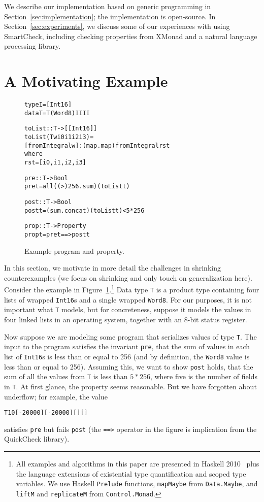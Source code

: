 \documentclass{sigplanconf}
\newenvironment{code}{\begin{alltt}}{\end{alltt}}
\newcommand{\ttp}[1]{\texttt{#1}}
\begin{document}
We describe our implementation based on generic programming in
Section~\ref{sec:implementation}; the implementation is open-source.  In
Section~\ref{sec:experiments}, we discuss some of our experiences with using
SmartCheck, including checking properties from XMonad and a natural language
processing library.

\section{A Motivating Example}\label{sec:example}

\begin{figure}[ht]
\begin{code}
type I   = [Int16]
data T   = T (Word8) I I I I

toList :: T -> [[Int16]]
toList (T w i0 i1 i2 i3) =
  [fromIntegral w] : (map . map) fromIntegral rst
  where
  rst = [i0, i1, i2, i3]

pre :: T -> Bool
pre t = all ((>) 256 . sum) (toList t)

post :: T -> Bool
post t = (sum . concat) (toList t) < 5 * 256

prop :: T -> Property
prop t = pre t ==> post t
\end{code}
  \caption{Example program and property.}
  \label{fig:initial}
\end{figure}

In this section, we motivate in more detail the challenges in shrinking
counterexamples (we focus on shrinking and only touch on generalization here).
Consider the example in Figure~\ref{fig:initial}.\footnote{All examples and
  algorithms in this paper are presented in Haskell 2010~\cite{haskell2010} plus
  the language extensions of existential type quantification and scoped type
  variables.  We use Haskell \ttp{Prelude} functions, \ttp{mapMaybe} from
  \ttp{Data.Maybe}, and \ttp{liftM} and \ttp{replicateM} from
  \ttp{Control.Monad}.}  Data type \ttp{T} is a product type containing four
lists of wrapped \ttp{Int16}s and a single wrapped \ttp{Word8}.  For our
purposes, it is not important what \ttp{T} models, but for concreteness, suppose
it models the values in four linked lists in an operating system, together with
an 8-bit status register.

Now suppose we are modeling some program that serializes values of type \ttp{T}.
The input to the program satisfies the invariant \ttp{pre}, that the sum of
values in each list of \ttp{Int16}s is less than or equal to 256 (and by
definition, the \ttp{Word8} value is less than or equal to 256).  Assuming this,
we want to show \ttp{post} holds, that the sum of all the values from \ttp{T} is
less than $5 * 256$, where five is the number of fields in \ttp{T}.  At first
glance, the property seems reasonable.  But we have forgotten about underflow;
for example, the value
%
\begin{code}
T 10 [-20000] [-20000] [] []
\end{code}
%
\noindent
satisfies \ttp{pre} but fails \ttp{post} (the \ttp{==>} operator in the figure
is implication from the QuickCheck library).
\end{document}
